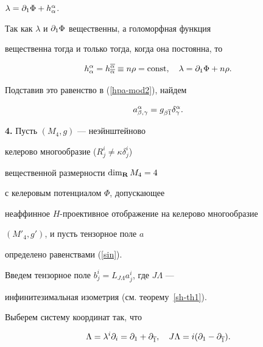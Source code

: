 $\lambda = \partial_ 1 \Phi + h^\alpha_\alpha$.


Так как $\lambda$ и $\partial_{1} \Phi$ вещественны, а голоморфная функция


вещественна тогда и только тогда, когда она постоянна, то


\begin{equation}


\label{rho1}


h^\alpha_\alpha =h^{\ol\alpha}_{\ol\alpha} \equiv


n\rho = \const, \quad


\lambda = \pl 1 \Phi +n\rho.


\end{equation}


Подставив это равенство в (\ref{hpa-mod2}), найдем


\begin{equation}


\label{hpa-mod3}


a^{\alpha}_{\beta,\gamma}= g_{\beta \ol 1} \delta^\alpha_\gamma.


\end{equation}





{\bf 4.} Пусть $(M_{4},g)$ --- неэйнштейново


келерово многообразие ($R^i_j\ne\kappa \delta^i_j$)


вещественной размерности $\dim_{\bold R} M_{4}=4$


с келеровым потенциалом $\Phi$, допускающее


неаффинное $H$-проективное отображение на келерово многообразие


$(M'_{4},g')$, и пусть тензорное поле $a$


определено равенствами (\ref{sin}).


Введем тензорное поле $b^i_j= L_{J\Lambda}a^i_j$, где $J \Lambda$ ---


инфинитезимальная изометрия (см. теорему~\ref{sh-th1}).





Выберем систему координат так, что


\begin{equation}


\label{lam-jlam}


\Lambda=\lambda^i\pl i=\pl 1+\pl{\ol 1}, \quad


J \Lambda = i\dmin.


\end{equation}


